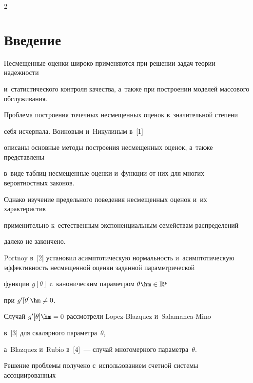 \begin{multicols}{2}





\label{st\stat}





\section{Введение}





  Несмещенные оценки широко применяются при решении задач теории надежности


  и~ста\-ти\-стического контроля качества, а~также при построении моделей массового обслуживания.


  Проб\-ле\-ма построения точечных несмещенных оценок в~значительной степени


 себя исчерпала.  Воиновым и~Никулиным в~[1]


 описаны основные методы построения несмещенных оценок, а~также пред\-став\-ле\-ны


 в~виде таблиц несмещенные оценки и~функции от них для многих вероятностных законов.





  Однако изучение предельного поведения несмещенных оценок и~их характеристик


 применительно к~естественным экспоненциальным семействам распределений


 далеко не закончено.


Portnoy в~[2] установил асимптотическую нормальность и~асимптотическую эффективность несмещенной оценки заданной параметрической


 функции $g[\theta]$ c~каноническим параметром $\theta\hm\in \Rp^p$


 при $g'[\theta]\hm\neq 0$.





  Случай $g'[\theta]\hm=0$ рассмотрели Lopez-Blazquez и~Salamanca-Mino


  в~[3] для скалярного параметра~$\theta$,


 а~Blazquez и~Rubio в~[4]~--- случай многомерного параметра~$\theta.$


%


  Решение проблемы получено с~использованием счетной системы ассоциированных



\end{multicols}
